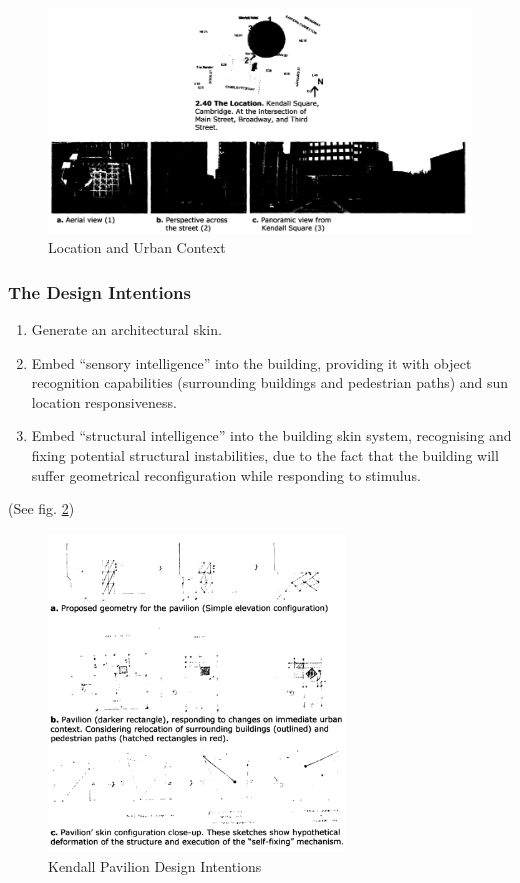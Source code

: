 \begin{figure}[htbp]
\centering
\includegraphics[width=\textwidth]{./Images/8-LocUrban}
\caption[Kendall Pavilion Location and Urban Context]{Location and Urban Context \cite{zulas04}}
\label{fig:KedLoc}
\end{figure}

\subsubsection{The Design Intentions} 
\vspace{-0.3cm}
\begin{enumerate}
\item Generate an architectural skin.
\item Embed ``sensory intelligence'' into the building, providing it with object recognition capabilities (surrounding buildings and pedestrian paths) and sun location responsiveness.
\item Embed ``structural intelligence'' into the building skin system, recognising and fixing potential structural instabilities, due to the fact that the building will suffer geometrical reconfiguration while responding to stimulus.
\end{enumerate}
\vspace{-0.4cm}
(See fig. \ref{fig:KenPavDesInt})

\begin{figure}[htbp]
\centering
\includegraphics[width=0.7\textwidth]{./Images/9-DesInt}
\caption[Kendall Pavilion Design Intentions]{Kendall Pavilion Design Intentions \cite{zulas04}}
\label{fig:KenPavDesInt}
\end{figure}

